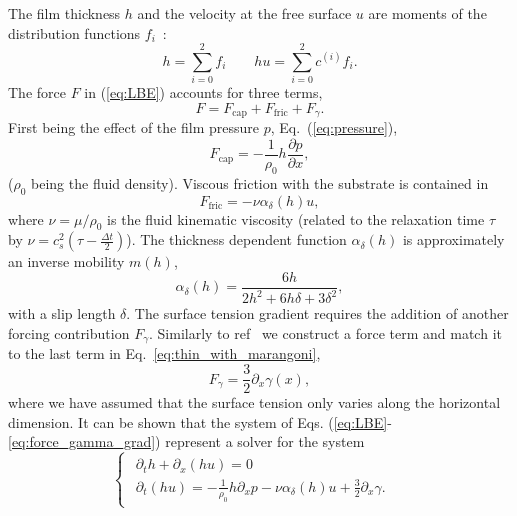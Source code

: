 \documentclass[twocolumn,amsmath,amssymb,showpacs,pre,nofootinbib,superscriptaddress]{revtex4-1} %
\begin{document}
The film thickness $h$ and the velocity at the free surface $u$ are moments of the distribution functions $f_i$~\cite{Salmon:1999:0022-2402:503, PhysRevE.65.036309, PhysRevE.104.034801}:
\begin{equation}\label{eq:hydrofields}
    h= \sum_{i=0}^2 f_i \qquad hu = \sum_{i=0}^2 c^{(i)} f_i.
\end{equation}
The force $F$ in (\ref{eq:LBE}) accounts for three terms,
\begin{equation}\label{eq:force}
    F = F_{\text{cap}} + F_{\text{fric}} + F_{\gamma}.  
\end{equation}
First being the effect of the film pressure $p$, Eq.~(\ref{eq:pressure}), 
\begin{equation}\label{eq:capillary_force}
    F_{\text{cap}} = -\frac{1}{\rho_0} h \frac{\partial p}{\partial x},
\end{equation}
($\rho_0$ being the fluid density). 
Viscous friction with the substrate is contained in
\begin{equation}\label{eq:fric_force}
    F_{\text{fric}} = -\nu \alpha_{\delta}(h) u,
\end{equation}
where $\nu=\mu/\rho_0$ is the fluid kinematic viscosity (related to the relaxation time $\tau$ by $\nu = c_s^2\left(\tau-\frac{\Delta t}{2}\right)$).
The thickness dependent function $\alpha_{\delta}(h)$ is approximately an inverse mobility $m(h)$,
\begin{equation}\label{eq:fric_alpha}
     \alpha_{\delta}(h) = \frac{6 h}{2h^2 + 6h\delta + 3\delta^2},
\end{equation}
with a slip length $\delta$.
The surface tension gradient requires the addition of another forcing contribution $F_{\gamma}$.
Similarly to ref~\cite{PhysRevE.104.034801} we construct a force term and match it to the last term in Eq.~\ref{eq:thin_with_marangoni}, 
\begin{equation}\label{eq:force_gamma_grad}
    F_{\gamma} = \frac{3}{2}\partial_x\gamma(x),
\end{equation}
where we have assumed that the surface tension only varies along the horizontal dimension.
It can be shown that the system of Eqs. (\ref{eq:LBE}-\ref{eq:force_gamma_grad}) represent a solver for the system
\begin{equation}\label{eq:lubr2eq1surf}
\begin{cases}
\begin{array}{ll}
\partial_t h + \partial_x (h u)  = 0 & \\ 
\partial_t (h u) = -\frac{1}{\rho_0}h\partial_x p -\nu\alpha_{\delta}(h)u + \frac{3}{2}\partial_x\gamma.
\end{array}
\end{cases}
\end{equation}
\end{document}
